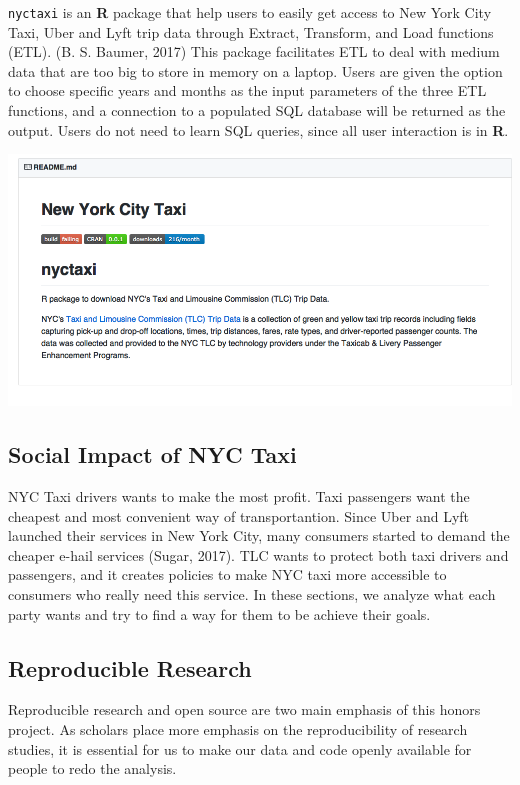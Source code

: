 \documentclass[12pt,twoside]{reedthesis}
\theoremstyle{definition}
\theoremstyle{definition}
\theoremstyle{definition}
\theoremstyle{remark}
\begin{document}
\texttt{nyctaxi} is an \textbf{R} package that help users to easily get
access to New York City Taxi, Uber and Lyft trip data through Extract,
Transform, and Load functions (ETL). (B. S. Baumer, 2017) This package
facilitates ETL to deal with medium data that are too big to store in
memory on a laptop. Users are given the option to choose specific years
and months as the input parameters of the three ETL functions, and a
connection to a populated SQL database will be returned as the output.
Users do not need to learn SQL queries, since all user interaction is in
\textbf{R}.
\begin{center}\includegraphics[width=5.88in]{figure/nyctaxi-page} \end{center}

\subsection{Social Impact of NYC Taxi}\label{social-impact-of-nyc-taxi}

NYC Taxi drivers wants to make the most profit. Taxi passengers want the
cheapest and most convenient way of transportantion. Since Uber and Lyft
launched their services in New York City, many consumers started to
demand the cheaper e-hail services (Sugar, 2017). TLC wants to protect
both taxi drivers and passengers, and it creates policies to make NYC
taxi more accessible to consumers who really need this service. In these
sections, we analyze what each party wants and try to find a way for
them to be achieve their goals.

\subsection{Reproducible Research}\label{reproducible-research}

Reproducible research and open source are two main emphasis of this
honors project. As scholars place more emphasis on the reproducibility
of research studies, it is essential for us to make our data and code
openly available for people to redo the analysis.
\end{document}
